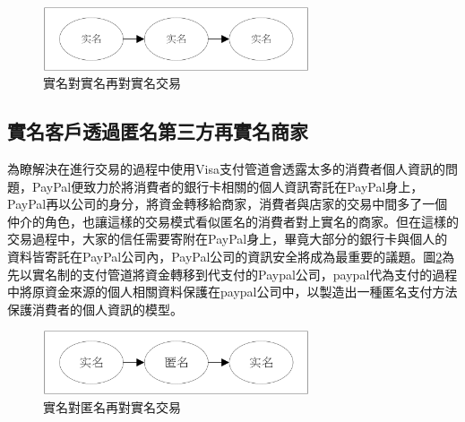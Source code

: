 		\begin{figure}[h]
			\centering
			\includegraphics[width = 0.7\textwidth]{modennn.png}
			\caption{實名對實名再對實名交易}\label{modennn}
		\end{figure}

		\subsection{實名客戶透過匿名第三方再實名商家}
		為瞭解決在進行交易的過程中使用Visa支付管道會透露太多的消費者個人資訊的問題，PayPal便致力於將消費者的銀行卡相關的個人資訊寄託在PayPal身上，PayPal再以公司的身分，將資金轉移給商家，消費者與店家的交易中間多了一個仲介的角色，也讓這樣的交易模式看似匿名的消費者對上實名的商家。但在這樣的交易過程中，大家的信任需要寄附在PayPal身上，畢竟大部分的銀行卡與個人的資料皆寄託在PayPal公司內，PayPal公司的資訊安全將成為最重要的議題。圖\ref{modenan}為先以實名制的支付管道將資金轉移到代支付的Paypal公司，paypal代為支付的過程中將原資金來源的個人相關資料保護在paypal公司中，以製造出一種匿名支付方法保護消費者的個人資訊的模型。

		\begin{figure}[h]
			\centering
			\includegraphics[width = 0.7\textwidth]{modenan.png}
			\caption{實名對匿名再對實名交易}\label{modenan}
		\end{figure}

